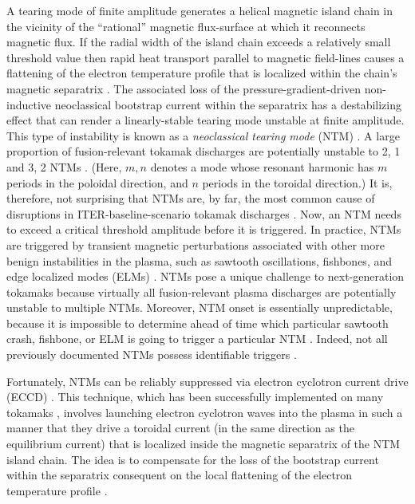\documentclass{iopjournal}
\begin{document}
A tearing mode \cite{tear1} of finite amplitude generates a helical magnetic island chain \cite{ntm1} in the vicinity of the ``rational''  magnetic flux-surface \cite{ideal3} at which it reconnects magnetic flux.
If the radial width of the island chain exceeds a relatively small threshold value then rapid  heat transport parallel to magnetic field-lines causes a flattening of the  electron temperature profile
that is localized within the chain's magnetic separatrix \cite{ntm2}. The associated loss of the pressure-gradient-driven non-inductive neoclassical bootstrap current \cite{ntm3} within the separatrix
has a destabilizing effect that can render a linearly-stable tearing mode unstable at finite amplitude. This type of instability is known as a {\em neoclassical tearing mode}\/  (NTM) \cite{tftr,ntm4c,ntm4b,ntm4a}.  A large proportion of fusion-relevant tokamak
discharges are potentially unstable  to 2, 1 and 3, 2 NTMs \cite{ntm4,ntm5}.  (Here, $m, n$ denotes a mode whose resonant harmonic has $m$ periods in the poloidal
direction, and $n$ periods in the toroidal direction.) It is, therefore, not  surprising that NTMs are, by far, the most common cause of disruptions in ITER-baseline-scenario tokamak
discharges \cite{iter,ntm4,ntm5,vries}.
Now, an NTM needs to exceed a critical  threshold amplitude
before it is triggered. In practice, NTMs are
triggered by transient magnetic perturbations associated with other more benign instabilities in the plasma, such as sawtooth oscillations, fishbones, and
edge localized modes (ELMs) \cite{ntm4,ntm5,sawtooth,elm}. NTMs pose a unique challenge to next-generation tokamaks  because  virtually all fusion-relevant plasma discharges 
are potentially unstable to multiple NTMs. Moreover, NTM onset is essentially unpredictable, because it
is impossible to determine ahead of time which particular sawtooth crash, fishbone, or ELM is going to trigger a particular NTM \cite{nstx}. Indeed, not all previously documented NTMs possess identifiable
triggers \cite{ntm6}. 

Fortunately, NTMs can be reliably suppressed via electron cyclotron current drive (ECCD) \cite{zohm,prater}. This technique, which has been
successfully implemented on many tokamaks \cite{eccd1,eccd2,eccd3,eccd3a,eccd3b,eccd4,eccd5}, involves
launching electron cyclotron waves into the plasma in such a manner that they drive a toroidal current (in the same direction as the equilibrium current) that is 
localized  inside the magnetic separatrix of
the NTM island chain. The idea is to compensate for the loss of the bootstrap current within the separatrix consequent on the local flattening
of the electron temperature profile \cite{ntm4,ntm5}.
\end{document}
